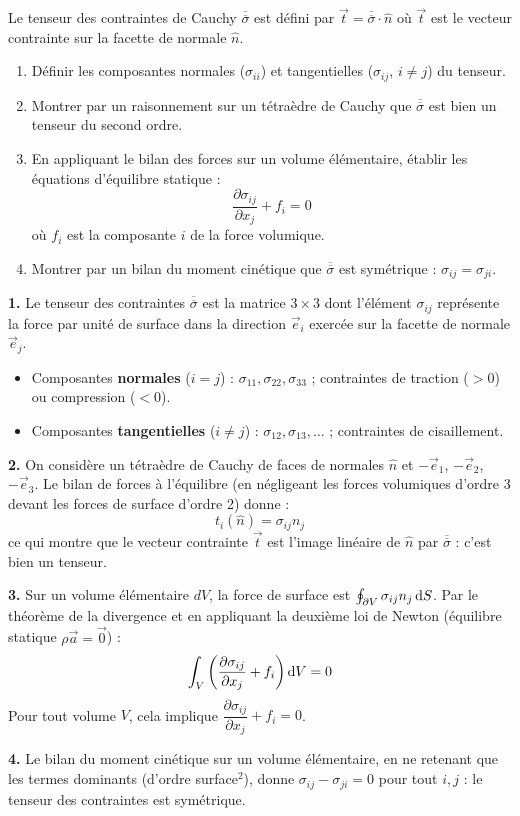 \documentclass[12pt,a4paper]{article}
\begin{document}
\begin{boiteexercice}
Le tenseur des contraintes de Cauchy $\overline{\overline{\sigma}}$ est défini par $\vec{t} = \overline{\overline{\sigma}}\cdot\hat{n}$ où $\vec{t}$ est le vecteur contrainte sur la facette de normale $\hat{n}$.
\begin{enumerate}
  \item Définir les composantes normales ($\sigma_{ii}$) et tangentielles ($\sigma_{ij}$, $i\neq j$) du tenseur.
  \item Montrer par un raisonnement sur un tétraèdre de Cauchy que $\overline{\overline{\sigma}}$ est bien un tenseur du second ordre.
  \item En appliquant le bilan des forces sur un volume élémentaire, établir les équations d'équilibre statique :
  \[
  \frac{\partial\sigma_{ij}}{\partial x_j} + f_i = 0
  \]
  où $f_i$ est la composante $i$ de la force volumique.
  \item Montrer par un bilan du moment cinétique que $\overline{\overline{\sigma}}$ est symétrique : $\sigma_{ij} = \sigma_{ji}$.
\end{enumerate}
\end{boiteexercice}

\begin{boitecorrige}
\textbf{1.} Le tenseur des contraintes $\overline{\overline{\sigma}}$ est la matrice $3\times3$ dont l'élément $\sigma_{ij}$ représente la force par unité de surface dans la direction $\vec{e}_i$ exercée sur la facette de normale $\vec{e}_j$.
\begin{itemize}
  \item Composantes \textbf{normales} ($i=j$) : $\sigma_{11},\sigma_{22},\sigma_{33}$ ; contraintes de traction ($>0$) ou compression ($<0$).
  \item Composantes \textbf{tangentielles} ($i\neq j$) : $\sigma_{12},\sigma_{13},\ldots$ ; contraintes de cisaillement.
\end{itemize}

\textbf{2.} On considère un tétraèdre de Cauchy de faces de normales $\hat{n}$ et $-\vec{e}_1$, $-\vec{e}_2$, $-\vec{e}_3$. Le bilan de forces à l'équilibre (en négligeant les forces volumiques d'ordre 3 devant les forces de surface d'ordre 2) donne :
\[
t_i(\hat{n}) = \sigma_{ij}n_j
\]
ce qui montre que le vecteur contrainte $\vec{t}$ est l'image linéaire de $\hat{n}$ par $\overline{\overline{\sigma}}$ : c'est bien un tenseur.

\textbf{3.} Sur un volume élémentaire $dV$, la force de surface est $\oint_{\partial V}\sigma_{ij}n_j\,\mathrm{d} S$. Par le théorème de la divergence et en appliquant la deuxième loi de Newton (équilibre statique $\rho\vec{a}=\vec{0}$) :
\[
\int_V\left(\frac{\partial\sigma_{ij}}{\partial x_j} + f_i\right)\mathrm{d} V = 0
\]
Pour tout volume $V$, cela implique $\dfrac{\partial\sigma_{ij}}{\partial x_j} + f_i = 0$.

\textbf{4.} Le bilan du moment cinétique sur un volume élémentaire, en ne retenant que les termes dominants (d'ordre surface$^2$), donne $\sigma_{ij}-\sigma_{ji}=0$ pour tout $i,j$ : le tenseur des contraintes est symétrique.
\end{boitecorrige}
\end{document}
